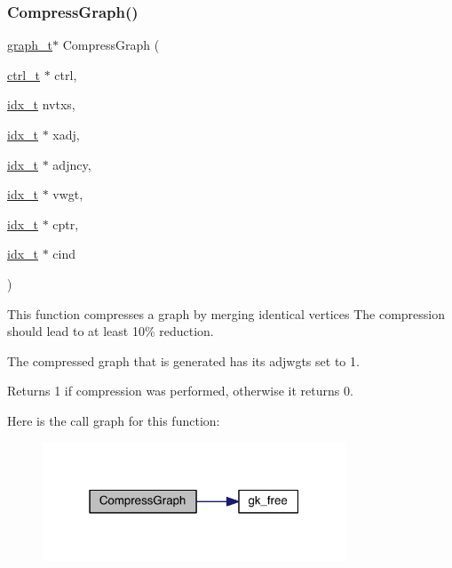 \subsubsection{\texorpdfstring{Compress\+Graph()}{CompressGraph()}}
{\footnotesize\ttfamily \hyperlink{a00734}{graph\+\_\+t}$\ast$ Compress\+Graph (\begin{DoxyParamCaption}\item[{\hyperlink{a00742}{ctrl\+\_\+t} $\ast$}]{ctrl,  }\item[{\hyperlink{a00876_aaa5262be3e700770163401acb0150f52}{idx\+\_\+t}}]{nvtxs,  }\item[{\hyperlink{a00876_aaa5262be3e700770163401acb0150f52}{idx\+\_\+t} $\ast$}]{xadj,  }\item[{\hyperlink{a00876_aaa5262be3e700770163401acb0150f52}{idx\+\_\+t} $\ast$}]{adjncy,  }\item[{\hyperlink{a00876_aaa5262be3e700770163401acb0150f52}{idx\+\_\+t} $\ast$}]{vwgt,  }\item[{\hyperlink{a00876_aaa5262be3e700770163401acb0150f52}{idx\+\_\+t} $\ast$}]{cptr,  }\item[{\hyperlink{a00876_aaa5262be3e700770163401acb0150f52}{idx\+\_\+t} $\ast$}]{cind }\end{DoxyParamCaption})}

This function compresses a graph by merging identical vertices The compression should lead to at least 10\% reduction.

The compressed graph that is generated has its adjwgts set to 1.

\begin{DoxyReturn}{Returns}
1 if compression was performed, otherwise it returns 0. 
\end{DoxyReturn}
Here is the call graph for this function\+:\nopagebreak
\begin{figure}[H]
\begin{center}
\leavevmode
\includegraphics[width=256pt]{a00945_aa4d0e5c89a60679b517deddad368b686_cgraph}
\end{center}
\end{figure}
\mbox{\label{a00945_a66257f7c528ad75c86244ef3794d1ae5}} 
